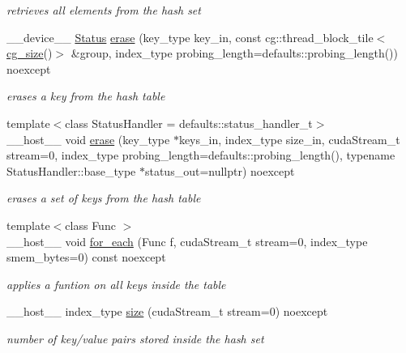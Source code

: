 \begin{DoxyCompactItemize}
\begin{DoxyCompactList}\small\item\em retrieves all elements from the hash set \end{DoxyCompactList}\item 
\+\_\+\+\_\+device\+\_\+\+\_\+ \hyperlink{classwarpcore_1_1Status}{Status} \hyperlink{classwarpcore_1_1HashSet_a255b77ba7f1ba8a1faabddfd92ae976c}{erase} (key\+\_\+type key\+\_\+in, const cg\+::thread\+\_\+block\+\_\+tile$<$ \hyperlink{classwarpcore_1_1HashSet_a0906259ae0be4a4f6f9ba74b4874e542}{cg\+\_\+size}()$>$ \&group, index\+\_\+type probing\+\_\+length=defaults\+::probing\+\_\+length()) noexcept
\begin{DoxyCompactList}\small\item\em erases a key from the hash table \end{DoxyCompactList}\item 
{\footnotesize template$<$class Status\+Handler  = defaults\+::status\+\_\+handler\+\_\+t$>$ }\\\+\_\+\+\_\+host\+\_\+\+\_\+ void \hyperlink{classwarpcore_1_1HashSet_a696bf66d7c677937294ee52254b72c95}{erase} (key\+\_\+type $\ast$keys\+\_\+in, index\+\_\+type size\+\_\+in, cuda\+Stream\+\_\+t stream=0, index\+\_\+type probing\+\_\+length=defaults\+::probing\+\_\+length(), typename Status\+Handler\+::base\+\_\+type $\ast$status\+\_\+out=nullptr) noexcept
\begin{DoxyCompactList}\small\item\em erases a set of keys from the hash table \end{DoxyCompactList}\item 
{\footnotesize template$<$class Func $>$ }\\\+\_\+\+\_\+host\+\_\+\+\_\+ void \hyperlink{classwarpcore_1_1HashSet_a8719aee40fca90a39085ac0253bbdd01}{for\+\_\+each} (Func f, cuda\+Stream\+\_\+t stream=0, index\+\_\+type smem\+\_\+bytes=0) const noexcept
\begin{DoxyCompactList}\small\item\em applies a funtion on all keys inside the table \end{DoxyCompactList}\item 
\+\_\+\+\_\+host\+\_\+\+\_\+ index\+\_\+type \hyperlink{classwarpcore_1_1HashSet_a7b1967bd8986a3bbebdfca54c461cae6}{size} (cuda\+Stream\+\_\+t stream=0) noexcept
\begin{DoxyCompactList}\small\item\em number of key/value pairs stored inside the hash set \end{DoxyCompactList}\item 

\end{DoxyCompactItemize}
